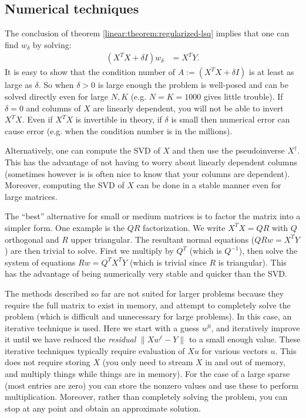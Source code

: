 \subsection{Numerical techniques}
\label{linear:subsection:numerical}
The conclusion of theorem \ref{linear:theorem:regularized-lsq} implies that one can find $w_\delta$ by solving:
\begin{align}
  (X^TX + \delta I)w_\delta &= X^TY.
  \label{linear:align:reg-problem}
\end{align}
It is easy to show that the condition number of $A:=(X^TX + \delta I)$ is at least as large as $\delta$.  So when $\delta>0$ is large enough the problem is well-posed and can be solved directly even for large $N, K$ (e.g. $N=K=1000$ gives little trouble).  If $\delta=0$ and columns of $X$ are linearly dependent, you will not be able to invert $X^TX$.   Even if $X^TX$ is invertible in theory, if $\delta$ is small then numerical error can cause error (e.g. when the condition number is in the millions).

Alternatively, one can compute the SVD of $X$ and then use the pseudoinverse $X^\dagger$.  This has the advantage of not having to worry about linearly dependent columns (sometimes however is is often nice to know that your columns are dependent).  Moreover, computing the SVD of $X$ can be done in a stable manner even for large matrices.

The ``best'' alternative for small or medium matrices is to factor the matrix into a simpler form.  One example is the $QR$ factorization.  We write $X^TX = QR$ with $Q$ orthogonal and $R$ upper triangular.  The resultant normal equations ($QRw = X^TY$) are then trivial to solve.  First we multiply by $Q^T$ (which is $Q^{-1}$), then solve the system of equations $Rw = Q^TX^TY$ (which is trivial since $R$ is triangular).  This has the advantage of being numerically very stable and quicker than the SVD.  

The methods described so far are not suited for larger problems because they require the full matrix to exist in memory, and attempt to completely solve the problem (which is difficult and unnecessary for large problems).  In this case, an iterative technique is used.  Here we start with a guess $w^0$, and iteratively improve it until we have reduced the \emph{residual} $\|Xw^\ell - Y\|$ to a small enough value.  These iterative techniques typically require evaluation of $Xu$ for various vectors $u$.  This does not require storing $X$ (you only need to stream $X$ in and out of memory, and multiply things while things are in memory).  For the case of a large sparse (most entries are zero) you can store the nonzero values and use these to perform multiplication.  Moreover, rather than completely solving the problem, you can stop at any point and obtain an approximate solution.


